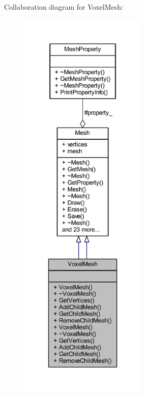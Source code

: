 Collaboration diagram for Voxel\+Mesh\+:\nopagebreak
\begin{figure}[H]
\begin{center}
\leavevmode
\includegraphics[height=550pt]{class_voxel_mesh__coll__graph}
\end{center}
\end{figure}
